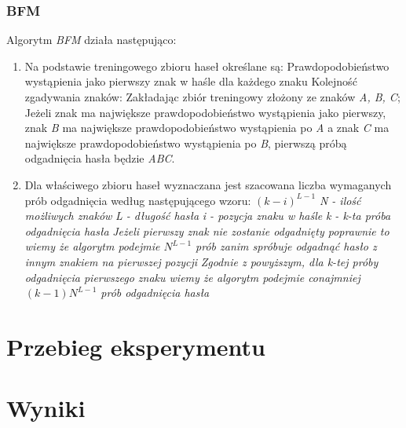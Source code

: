 \documentclass{article}
\begin{document}
\subsubsection{BFM}
Algorytm \textit{BFM} działa następująco:
\begin{enumerate}
	\item Na podstawie treningowego zbioru haseł określane są:
		\subitem Prawdopodobieństwo wystąpienia jako pierwszy znak w haśle dla każdego znaku
		\subitem Kolejność zgadywania znaków: 
			\subsubitem Zakładając zbiór treningowy złożony ze znaków \textit{A, B, C}; Jeżeli znak  ma największe prawdopodobieństwo wystąpienia jako pierwszy, znak \textit{B} ma największe prawdopodobieństwo wystąpienia po \textit{A} a znak \textit{C} ma największe prawdopodobieństwo wystąpienia po \textit{B}, pierwszą próbą odgadnięcia hasła będzie \textit{ABC}.
	\item Dla właściwego zbioru haseł wyznaczana jest szacowana liczba wymaganych prób odgadnięcia według następującego wzoru: $ (k-i)^{L-1} $
		\subitem \textit{N - ilość możliwych znaków} 
		\subitem \textit{L - długość hasła}
		\subitem \textit{i - pozycja znaku w haśle}
		\subitem \textit{k - k-ta próba odgadnięcia hasła}
		\subitem \textit{Jeżeli pierwszy znak nie zostanie odgadnięty poprawnie to wiemy że algorytm podejmie $ N^{L-1} $ prób zanim spróbuje odgadnąć hasło z innym znakiem na pierwszej pozycji}
		\subitem \textit{Zgodnie z powyższym, dla k-tej próby odgadnięcia pierwszego znaku wiemy że algorytm podejmie conajmniej $ (k-1)N^{L-1} $ prób odgadnięcia hasła}
\end{enumerate}

\newpage
\section{Przebieg eksperymentu}

\section{Wyniki}
\end{document}

